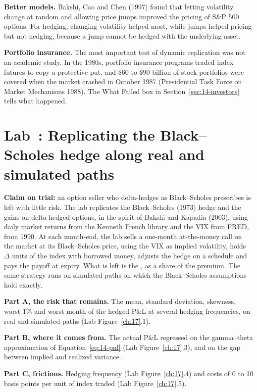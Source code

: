 \textbf{Better models.} Bakshi, Cao and Chen (1997) found that letting volatility change at random and allowing price jumps improved the pricing of S\&P 500 options. For hedging, changing volatility helped most, while jumps helped pricing but not hedging, because a jump cannot be hedged with the underlying asset.

\textbf{Portfolio insurance.} The most important test of dynamic replication was not an academic study. In the 1980s, portfolio insurance programs traded index futures to copy a protective put, and \$60 to \$90 billion of stock portfolios were covered when the market crashed in October 1987 (Presidential Task Force on Market Mechanisms 1988). The What Failed box in Section~\ref{sec:14-investors} tells what happened.

\section{Lab~\thechapter: Replicating the Black--Scholes hedge along real and simulated paths}
\label{sec:14-lab}

\textbf{Claim on trial:} an option seller who delta-hedges as Black--Scholes prescribes is left with little risk. The lab replicates the Black--Scholes (1973) hedge and the gains on delta-hedged options, in the spirit of Bakshi and Kapadia (2003), using daily market returns from the Kenneth French library and the VIX from FRED, from 1990. At each month-end, the lab sells a one-month at-the-money call on the market at its Black--Scholes price, using the VIX as implied volatility, holds $\Delta$ units of the index with borrowed money, adjusts the hedge on a schedule and pays the payoff at expiry. What is left is the , as a share of the premium. The same strategy runs on simulated paths on which the Black--Scholes assumptions hold exactly.

\textbf{Part A, the risk that remains.} The mean, standard deviation, skewness, worst 1\% and worst month of the hedged P\&L at several hedging frequencies, on real and simulated paths (Lab Figure~\ref{ch:17}.1).

\textbf{Part B, where it comes from.} The actual P\&L regressed on the gamma--theta approximation of Equation~\eqref{eq:14-pnl} (Lab Figure~\ref{ch:17}.3), and on the gap between implied and realized variance.

\textbf{Part C, frictions.} Hedging frequency (Lab Figure~\ref{ch:17}.4) and costs of 0 to 10 basis points per unit of index traded (Lab Figure~\ref{ch:17}.5).

